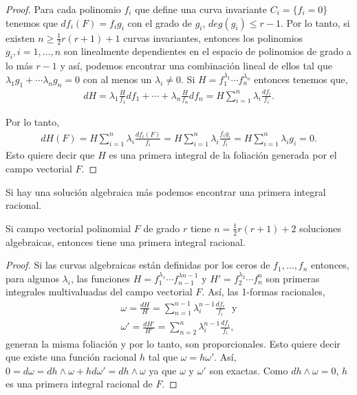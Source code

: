 \begin{proof}
Para cada polinomio $f_{i}$ que define una curva invariante $C_{i}=\{f_{i}=0\}$ tenemos que $df_{i}(F)=f_{i}g_{i}$ con el grado de $g_{i}$, $deg(g_{i})\leq r-1$. Por lo tanto, si existen $n\geq \frac{1}{2}r(r+1)+1$ curvas invariantes, entonces los polinomios $g_{i}, i=1,\ldots,n$ son linealmente dependientes en el espacio de polinomios de grado a lo más $r-1$ y así, podemos encontrar una combinación lineal de ellos tal que $\lambda_{1}g_{1}+\cdots \lambda_{n}g_{n}=0$ con al menos un $\lambda_{i}\neq 0$. Si $H=f_{1}^{\lambda_{1}}\cdots f_{n}^{\lambda_{n}}$ entonces tenemos que,
\begin {align*}
dH=\lambda_{1}\frac{H}{f_{1}}df_{1}+\cdots+\lambda_{n}\frac{H}{f_{n}}df_{n}=H\sum_{i=1}^{n}\lambda_{i}\frac{df_{i}}{f_{i}}.
\end{align*}

\noindent Por lo tanto,
\begin{align*}
dH(F)=H\sum_{i=1}^{n}\lambda_{i}\frac{df_{i}(F)}{f_{i}}=H\sum_{i=1}^{n}\lambda_{i}\frac{f_{i}g_{i}}{f_{i}}=H\sum_{i=1}^{n}\lambda_{i}g_{i}=0.
\end{align*}
Esto quiere decir que $H$ es una primera integral de la foliación generada por el campo vectorial $F$.
\end{proof}

Si hay una solución algebraica más podemos encontrar una primera integral racional.

\begin{Teorema}
\label{Darboux}
Si campo vectorial polinomial $F$ de grado $r$ tiene $n=\frac{1}{2}r(r+1)+2$ soluciones algebraicas, entonces tiene una primera integral racional.
\end{Teorema}
\begin{proof}
Si las curvas algebraicas están definidas por los ceros de $f_{1},\ldots,f_{n}$ entonces, para algunos $\lambda_{i}$, las funciones $H=f_{1}^{\lambda_{1}}\cdots f_{n-1}^{\lambda{n-1}}$ y $H'=f_{2}^{\lambda_{2}}\cdots f_{n}^{n}$ son primeras integrales multivaluadas del campo vectorial $F$. Así, las 1-formas racionales,
\begin{align*}
\omega=\frac{dH}{H}=\sum_{n=1}^{n-1}\lambda_{i}^{n-1}\frac{df_{i}}{f_{i}}\,\,\,\, \mathrm{y}\\
\omega'=\frac{dH'}{H'}=\sum_{n=2}^{n}\lambda_{i}^{n-1}\frac{df_{i}}{f_{i}},
\end{align*}
\noindent generan la misma foliación y por lo tanto, son proporcionales. Esto quiere decir que existe una función racional $h$ tal que $\omega =h\omega'$. Así, $0=d\omega=dh\wedge \omega + hd\omega' =dh\wedge\omega$ ya que $\omega$ y $\omega'$ son exactas. Como $dh\wedge\omega =0$, $h$ es una primera integral racional de $F$.
\end{proof}

